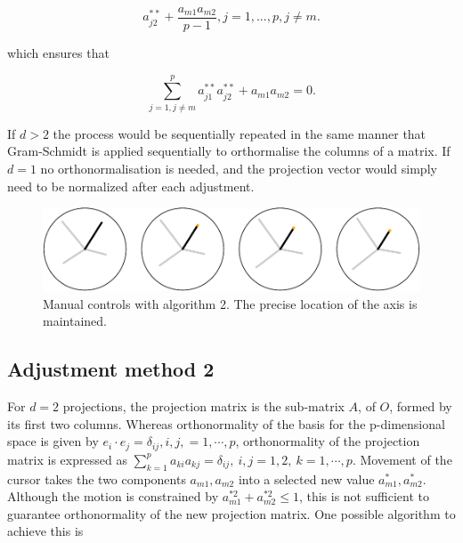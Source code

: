 \documentclass[]{interact}
\theoremstyle{plain}%
\theoremstyle{definition}
\theoremstyle{remark}
\begin{document}
\[a^{**}_{j2}+\frac{a_{m1}a_{m2}}{p-1}, j=1, ..., p, j\neq m.\]

which ensures that

\[\sum_{j=1, j\neq m}^p a^{**}_{j1}a^{**}_{j2} + a_{m1}a_{m2} = 0.\]

If \(d>2\) the process would be sequentially repeated in the same manner
that Gram-Schmidt is applied sequentially to orthormalise the columns of
a matrix. If \(d=1\) no orthonormalisation is needed, and the projection
vector would simply need to be normalized after each adjustment.

\begin{figure}
\includegraphics[width=1\linewidth]{appendix_files/figure-latex/othermethod-1} \caption{Manual controls with algorithm 2. The precise location of the axis is maintained.}\label{fig:othermethod}
\end{figure}

\hypertarget{adjustment-method-2}{%
\subsection{Adjustment method 2}\label{adjustment-method-2}}

For \(d=2\) projections, the projection matrix is the sub-matrix \(A\),
of \(O\), formed by its first two columns. Whereas orthonormality of the
basis for the p-dimensional space is given by
\(e_i\cdot e_j=\delta_{ij},{i,j,=1,\cdots, p}\), orthonormality of the
projection matrix is expressed as
\(\sum_{k=1}^p a_{ki} a_{kj}=\delta_{ij}, ~{i,j=1,2}, ~{k=1,\cdots,p}\).
Movement of the cursor takes the two components \({a_{m1},a_{m2}}\) into
a selected new value \({a^*_{m1},a^*_{m2}}\). Although the motion is
constrained by \(a^{*2}_{m1}+a^{*2}_{m2}\leq 1\), this is not sufficient
to guarantee orthonormality of the new projection matrix. One possible
algorithm to achieve this is
\end{document}
